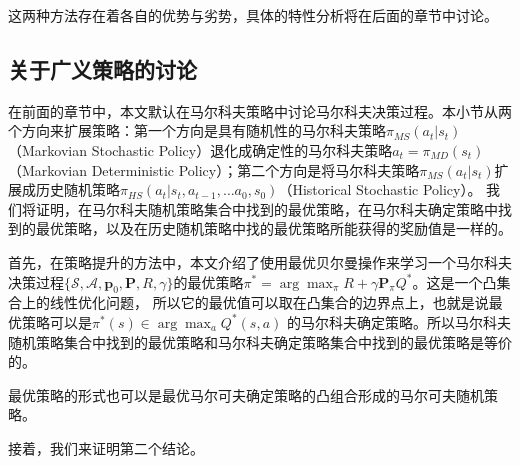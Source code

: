 这两种方法存在着各自的优势与劣势，具体的特性分析将在后面的章节中讨论。

\subsection{关于广义策略的讨论}
在前面的章节中，本文默认在马尔科夫策略中讨论马尔科夫决策过程。本小节从两个方向来扩展策略：第一个方向是具有随机性的马尔科夫策略$\pi_{MS}(a_t \vert s_t)$（Markovian Stochastic Policy）退化成确定性的马尔科夫策略$a_t = \pi_{MD}(s_t)$（Markovian Deterministic Policy）；第二个方向是将马尔科夫策略$\pi_{MS}(a_t \vert s_t)$扩展成历史随机策略$\pi_{HS}(a_t \vert s_t, a_{t-1}, \ldots a_0, s_0)$（Historical Stochastic Policy）。 我们将证明，在马尔科夫随机策略集合中找到的最优策略，在马尔科夫确定策略中找到的最优策略，以及在历史随机策略中找的最优策略所能获得的奖励值是一样的。

首先，在策略提升的方法中，本文介绍了使用最优贝尔曼操作来学习一个马尔科夫决策过程$\{\mathcal{S}, \mathcal{A}, \mathbf{p}_0, \mathbf{P}, R, \gamma\}$的最优策略$\pi^* = \arg\max_{\pi} R + \gamma\mathbf{P}_{\pi}Q^*$。这是一个凸集合上的线性优化问题， 所以它的最优值可以取在凸集合的边界点上，也就是说最优策略可以是$\pi^*(s) \in \arg\max_a Q^*(s, a)$ 的马尔科夫确定策略。所以马尔科夫随机策略集合中找到的最优策略和马尔科夫确定策略集合中找到的最优策略是等价的。

\begin{remark}
    最优策略的形式也可以是最优马尔可夫确定策略的凸组合形成的马尔可夫随机策略。
\end{remark}

接着，我们来证明第二个结论。

